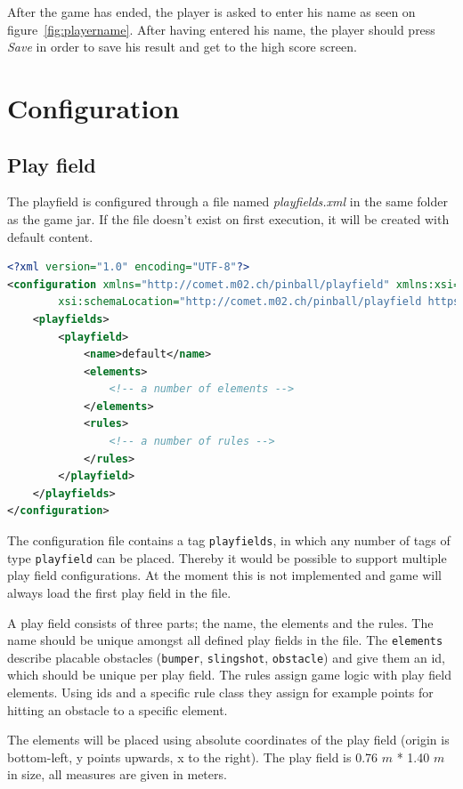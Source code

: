 \documentclass[fontsize=12pt,
               paper=a4,
               twoside=false,
               parskip=half,
               ]{scrartcl}
\begin{document}
After the game has ended, the player is asked to enter his name as seen on figure~\ref{fig:playername}. After having entered his name, the player should press \emph{Save} in order to save his result and get to the high score screen.

\section{Configuration}
\label{sec:configuration}

\subsection{Play field}

The playfield is configured through a file named \emph{playfields.xml} in the same folder as the game jar. If the file doesn't exist on first execution, it will be created with default content.

\begin{lstlisting}[language=xml,label=lst:default_playfield,caption={playfields.xml}]
<?xml version="1.0" encoding="UTF-8"?>
<configuration xmlns="http://comet.m02.ch/pinball/playfield" xmlns:xsi="http://www.w3.org/2001/XMLSchema-instance"
		xsi:schemaLocation="http://comet.m02.ch/pinball/playfield https://raw.github.com/boskoop/comet-pinball/master/schema/playfield.xsd">
	<playfields>
		<playfield>
			<name>default</name>
			<elements>
				<!-- a number of elements -->
			</elements>
			<rules>
				<!-- a number of rules -->
			</rules>
		</playfield>
	</playfields>
</configuration>
\end{lstlisting}

The configuration file contains a tag \texttt{playfields}, in which any number of tags of type \texttt{playfield} can be placed. Thereby it would be possible to support multiple play field configurations. At the moment this is not implemented and game will always load the first play field in the file.

A play field consists of three parts; the name, the elements and the rules. The name should be unique amongst all defined play fields in the file. The \texttt{elements} describe placable obstacles (\texttt{bumper}, \texttt{slingshot}, \texttt{obstacle}) and give them an id, which should be unique per play field. The rules assign game logic with play field elements. Using ids and a specific rule class they assign for example points for hitting an obstacle to a specific element.

The elements will be placed using absolute coordinates of the play field (origin is bottom-left, y points upwards, x to the right). The play field is 0.76 $m$ * 1.40 $m$ in size, all measures are given in meters.
\end{document}

